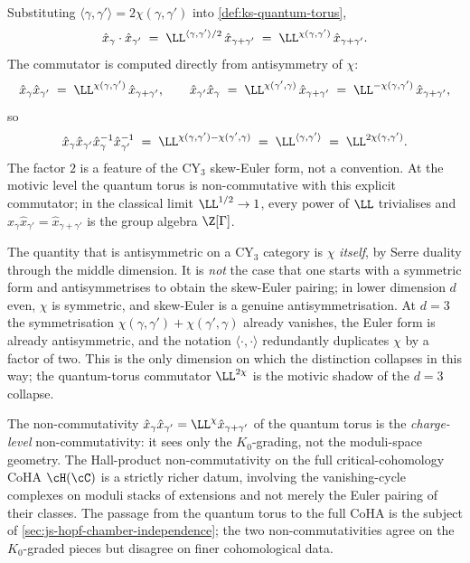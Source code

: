 Substituting $\langle \gamma, \gamma' \rangle = 2\chi(\gamma, \gamma')$ into
\cref{def:ks-quantum-torus},
\[
 \hat{x}_\gamma \cdot \hat{x}_{\gamma'} \;=\; \LL^{\langle \gamma, \gamma' \rangle / 2}\, \hat{x}_{\gamma + \gamma'}
 \;=\; \LL^{\chi(\gamma, \gamma')}\, \hat{x}_{\gamma + \gamma'}.
\]
The commutator is computed directly from antisymmetry of $\chi$:
\[
 \hat{x}_\gamma \hat{x}_{\gamma'} \;=\; \LL^{\chi(\gamma, \gamma')}\, \hat{x}_{\gamma+\gamma'},
 \qquad
 \hat{x}_{\gamma'} \hat{x}_\gamma \;=\; \LL^{\chi(\gamma', \gamma)}\, \hat{x}_{\gamma+\gamma'}
 \;=\; \LL^{-\chi(\gamma, \gamma')}\, \hat{x}_{\gamma+\gamma'},
\]
so
\[
 \hat{x}_\gamma \hat{x}_{\gamma'} \hat{x}_\gamma^{-1} \hat{x}_{\gamma'}^{-1}
 \;=\; \LL^{\chi(\gamma, \gamma') - \chi(\gamma', \gamma)} \;=\; \LL^{\langle \gamma, \gamma'\rangle}
 \;=\; \LL^{2\chi(\gamma, \gamma')}.
\]
The factor $2$ is a feature of the CY$_3$ skew-Euler form, not a convention.
At the motivic level the quantum torus is non-commutative with this
explicit commutator; in the classical limit $\LL^{1/2} \to 1$, every
power of $\LL$ trivialises and $\hat{x}_\gamma \hat{x}_{\gamma'} = \hat{x}_{\gamma+\gamma'}$ is the
group algebra $\Z[\Gamma]$.

\begin{remark}
 \label{rem:chi-antisymmetric-cy3}
 The quantity that is antisymmetric on a CY$_3$ category is $\chi$
 \emph{itself}, by Serre duality through the middle dimension. It is
 \emph{not} the case that one starts with a symmetric form and
 antisymmetrises to obtain the skew-Euler pairing; in lower dimension
 $d$ even, $\chi$ is symmetric, and skew-Euler is a genuine
 antisymmetrisation. At $d = 3$ the symmetrisation
 $\chi(\gamma, \gamma') + \chi(\gamma', \gamma)$ already vanishes, the
 Euler form is already antisymmetric, and the notation $\langle \cdot, \cdot\rangle$
 redundantly duplicates $\chi$ by a factor of two. This is the only
 dimension on which the distinction collapses in this way; the
 quantum-torus commutator $\LL^{2\chi}$ is the motivic shadow of the
 $d=3$ collapse.
\end{remark}

\begin{remark}
 \label{rem:hall-product-distinct}
 The non-commutativity $\hat{x}_\gamma \hat{x}_{\gamma'} = \LL^\chi \hat{x}_{\gamma+\gamma'}$ of the quantum
 torus is the \emph{charge-level} non-commutativity: it sees only the
 $K_0$-grading, not the moduli-space geometry. The Hall-product
 non-commutativity on the full critical-cohomology CoHA $\cH(\cC)$ is a
 strictly richer datum, involving the vanishing-cycle complexes on
 moduli stacks of extensions and not merely the Euler pairing of their
 classes. The passage from the quantum torus to the full CoHA is the
 subject of \cref{sec:js-hopf-chamber-independence}; the two
 non-commutativities agree on the $K_0$-graded pieces but disagree on
 finer cohomological data.
\end{remark}

